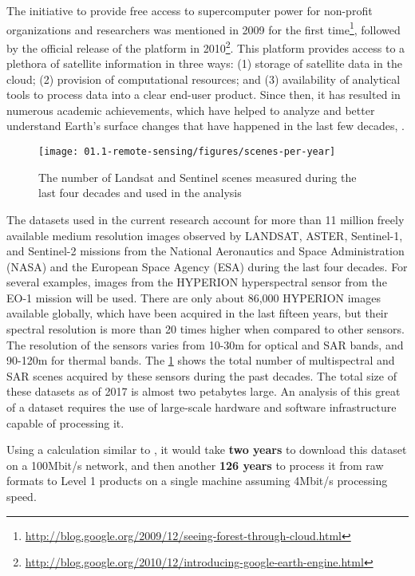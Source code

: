 The initiative to provide free access to supercomputer power for non-profit organizations and researchers was mentioned in 2009 for the first time\footnote{\url{http://blog.google.org/2009/12/seeing-forest-through-cloud.html}}, followed by the official release of the platform in 2010\footnote{\url{http://blog.google.org/2010/12/introducing-google-earth-engine.html}}. This platform provides access to a plethora of satellite information in three ways: (1) storage of satellite data in the cloud; (2) provision of computational resources; and (3) availability of analytical tools to process data into a clear end-user product. Since then, it has resulted in numerous academic achievements, which have helped to analyze and better understand Earth's surface changes that have happened in the last few decades\citep{Hansen2013}, \citep{pekel2016high}. 

\begin{figure}
	\centering
	\texttt{[image: 01.1-remote-sensing/figures/scenes-per-year]}
	\caption{The number of Landsat and Sentinel scenes measured during the last four decades and used in the analysis}
	\label{fig:sensor-count}
\end{figure}

The datasets used in the current research account for more than 11 million freely available medium resolution images observed by LANDSAT, ASTER, Sentinel-1, and Sentinel-2 missions from the National Aeronautics and Space Administration (NASA) and the European Space Agency (ESA) during the last four decades. For several examples, images from the HYPERION hyperspectral sensor from the EO-1 mission will be used. There are only about 86,000 HYPERION images available globally, which have been acquired in the last fifteen years, but their spectral resolution is more than 20 times higher when compared to other sensors. The resolution of the sensors varies from 10-30m for optical and SAR bands, and 90-120m for thermal bands. The \ref{fig:sensor-count} shows the total number of multispectral and SAR scenes acquired by these sensors during the past decades. The total size of these datasets as of 2017 is almost two petabytes large. An analysis of this great of a dataset requires the use of large-scale hardware and software infrastructure capable of processing it.

Using a calculation similar to \citep{wagner2015big}, it would take \textbf{two years} to download this dataset on a 100Mbit/s network, and then another \textbf{126 years} to process it from raw formats to Level 1 products on a single machine assuming 4Mbit/s processing speed.


